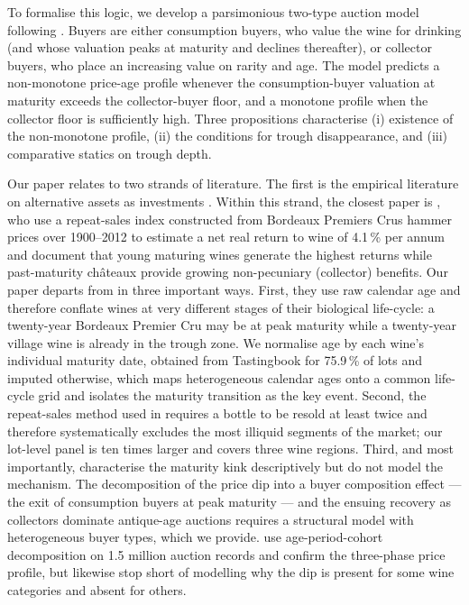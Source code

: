 To formalise this logic, we develop a parsimonious two-type auction model following
\citet{lovo2018}. Buyers are either consumption buyers, who value the wine for drinking
(and whose valuation peaks at maturity and declines thereafter), or collector buyers, who
place an increasing value on rarity and age. The model predicts a non-monotone price-age
profile whenever the consumption-buyer valuation at maturity exceeds the collector-buyer
floor, and a monotone profile when the collector floor is sufficiently high. Three
propositions characterise (i) existence of the non-monotone profile, (ii) the conditions
for trough disappearance, and (iii) comparative statics on trough depth.

Our paper relates to two strands of literature. The first is the empirical literature on
alternative assets as investments \citep{baumol1986, goetzmann1993, mei2002,
korteweg2016, goetzmann2021}. Within this strand, the closest paper is
\citet{dimson2015}, who use a repeat-sales index constructed from Bordeaux Premiers Crus
hammer prices over 1900--2012 to estimate a net real return to wine of 4.1\,\% per annum
and document that young maturing wines generate the highest returns while past-maturity
ch\^{a}teaux provide growing non-pecuniary (collector) benefits. Our paper departs from
\citet{dimson2015} in three important ways. First, they use raw calendar age and therefore
conflate wines at very different stages of their biological life-cycle: a twenty-year
Bordeaux Premier Cru may be at peak maturity while a twenty-year village wine is already in
the trough zone. We normalise age by each wine's individual maturity date, obtained from
Tastingbook for 75.9\,\% of lots and imputed otherwise, which maps heterogeneous calendar
ages onto a common life-cycle grid and isolates the maturity transition as the key event.
Second, the repeat-sales method used in \citet{dimson2015} requires a bottle to be resold
at least twice and therefore systematically excludes the most illiquid segments of the
market; our lot-level panel is ten times larger and covers three wine regions. Third, and
most importantly, \citet{dimson2015} characterise the maturity kink descriptively but do not
model the mechanism. The decomposition of the price dip into a buyer composition effect ---
the exit of consumption buyers at peak maturity --- and the ensuing recovery as collectors
dominate antique-age auctions requires a structural model with heterogeneous buyer types,
which we provide. \citet{breeden2017} use age-period-cohort decomposition on 1.5 million
auction records and confirm the three-phase price profile, but likewise stop short of
modelling why the dip is present for some wine categories and absent for others.

